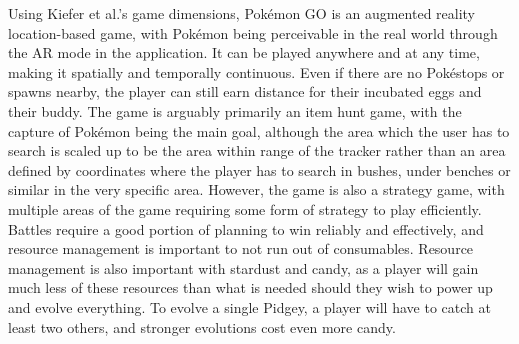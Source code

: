 Using Kiefer et al.'s \cite{kiefer2006systematically} game dimensions, Pokémon GO is an augmented reality location-based game, with Pokémon being perceivable in the real world through the AR mode in the application. It can be played anywhere and at any time, making it spatially and temporally continuous. Even if there are no Pokéstops or spawns nearby, the player can still earn distance for their incubated eggs and their buddy. The game is arguably primarily an item hunt game, with the capture of Pokémon being the main goal, although the area which the user has to search is scaled up to be the area within range of the tracker rather than an area defined by coordinates where the player has to search in bushes, under benches or similar in the very specific area. However, the game is also a strategy game, with multiple areas of the game requiring some form of strategy to play efficiently. Battles require a good portion of planning to win reliably and effectively, and resource management is important to not run out of consumables. Resource management is also important with stardust and candy, as a player will gain much less of these resources than what is needed should they wish to power up and evolve everything. To evolve a single Pidgey, a player will have to catch at least two others, and stronger evolutions cost even more candy.


\section{}

